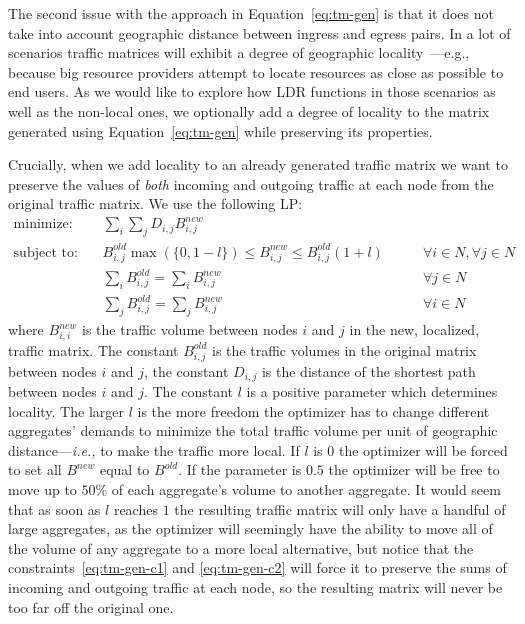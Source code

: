 \documentclass[12pt, letterpaper]{article}
\begin{document}
The second issue with the approach in Equation~\ref{eq:tm-gen} is that
it does not take into account geographic distance between ingress and
egress pairs. In a lot of scenarios traffic matrices will exhibit a
degree of geographic locality~\cite{schuller2017traffic}---{e.g.,}
because big resource providers attempt to locate resources as close as
possible to end users. As we would like to explore how LDR functions
in those scenarios as well as the non-local ones, we optionally add a
degree of locality to the matrix generated using
Equation~\ref{eq:tm-gen} while preserving its properties.

Crucially, when we add locality to an already generated traffic matrix
we want to preserve the values of {\em both} incoming and outgoing
traffic at each node from the original traffic matrix. We use the following LP:
\begin{align}
  \text{minimize: } \quad &  \sum_{i}\sum_{j} D_{i,j} B^{new}_{i,j} & \nonumber \\ 
  \text{subject to: } \quad & B^{old}_{i,j} \max(\{0, 1 - l\}) \le B^{new}_{i, j} \le B^{old}_{i,j} (1 + l) \qquad & \forall i \in N, \forall j \in N \nonumber \\
  &  \sum_{i} B^{old}_{i,j} = \sum_{i} B^{new}_{i,j} \qquad & \forall j \in N \label{eq:tm-gen-c1} \\
  &  \sum_{j} B^{old}_{i,j} = \sum_{j} B^{new}_{i,j} \qquad & \forall i \in N \label{eq:tm-gen-c2}
\end{align}
where $B^{new}_{i,i}$ is the traffic volume between nodes $i$ and $j$
in the new, localized, traffic matrix. The constant $B^{old}_{i,j}$ is
the traffic volumes in the original matrix between nodes $i$ and $j$,
the constant $D_{i,j}$ is the distance of the shortest path between
nodes $i$ and $j$. The constant $l$ is a positive parameter which
determines locality. The larger $l$ is the more freedom the optimizer
has to change different aggregates' demands to minimize the total
traffic volume per unit of geographic distance---{\em i.e.,} to make
the traffic more local. If $l$ is $0$ the optimizer will be forced to
set all $B^{new}$ equal to $B^{old}$. If the parameter is $0.5$ the
optimizer will be free to move up to $50\%$ of each aggregate's volume
to another aggregate. It would seem that as soon as $l$ reaches $1$
the resulting traffic matrix will only have a handful of large
aggregates, as the optimizer will seemingly have the ability to move all of the
volume of any aggregate to a more local alternative, but notice that
the constraints~\ref{eq:tm-gen-c1} and \ref{eq:tm-gen-c2} will force
it to preserve the sums of incoming and outgoing traffic at each node,
so the resulting matrix will never be too far off the original one.
\end{document}
